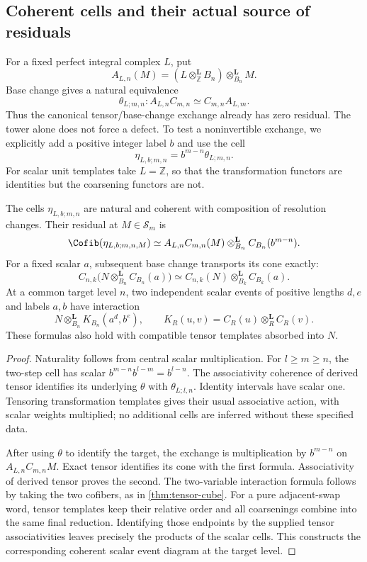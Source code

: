 \subsection{Coherent cells and their actual source of residuals}

For a fixed perfect integral complex $L$, put
\[
 A_{L,n}(M)=(L\otimes^{\mathbf L}_{\mathbb Z}B_n)\otimes^{\mathbf L}_{B_n}M.
\]
Base change gives a natural equivalence
\[
 \theta_{L;m,n}:A_{L,n}C_{m,n}\simeq C_{m,n}A_{L,m}.
\]
Thus the canonical tensor/base-change exchange already has zero residual. The tower alone does not force a defect. To test a noninvertible exchange, we explicitly add a positive integer label $b$ and use the cell
\[
 \eta_{L,b;m,n}=b^{m-n}\theta_{L;m,n}.
\]
For scalar unit templates take $L=\mathbb Z$, so that the transformation functors are identities but the coarsening functors are not.

\begin{theorem}\label{thm:weighted-adic-exchange}
The cells $\eta_{L,b;m,n}$ are natural and coherent with composition of resolution changes. Their residual at $M\in\mathcal S_m$ is
\[
 \Cofib(\eta_{L,b;m,n,M})\simeq
 A_{L,n}C_{m,n}(M)\otimes^{\mathbf L}_{B_n}C_{B_n}(b^{m-n}).
\]
For a fixed scalar $a$, subsequent base change transports its cone exactly:
\[
 C_{n,k}\bigl(N\otimes^{\mathbf L}_{B_n}C_{B_n}(a)\bigr)
 \simeq C_{n,k}(N)\otimes^{\mathbf L}_{B_k}C_{B_k}(a).
\]
At a common target level $n$, two independent scalar events of positive lengths $d,e$ and labels $a,b$ have interaction
\[
 N\otimes^{\mathbf L}_{B_n}K_{B_n}(a^d,b^e),\qquad
 K_R(u,v)=C_R(u)\otimes^{\mathbf L}_R C_R(v).
\]
These formulas also hold with compatible tensor templates absorbed into $N$.
\end{theorem}
\begin{proof}
Naturality follows from central scalar multiplication. For $l\geq m\geq n$, the two-step cell has scalar $b^{m-n}b^{l-m}=b^{l-n}$. The associativity coherence of derived tensor identifies its underlying $\theta$ with $\theta_{L;l,n}$. Identity intervals have scalar one. Tensoring transformation templates gives their usual associative action, with scalar weights multiplied; no additional cells are inferred without these specified data.

After using $\theta$ to identify the target, the exchange is multiplication by $b^{m-n}$ on $A_{L,n}C_{m,n}M$. Exact tensor identifies its cone with the first formula. Associativity of derived tensor proves the second. The two-variable interaction formula follows by taking the two cofibers, as in \cref{thm:tensor-cube}. For a pure adjacent-swap word, tensor templates keep their relative order and all coarsenings combine into the same final reduction. Identifying those endpoints by the supplied tensor associativities leaves precisely the products of the scalar cells. This constructs the corresponding coherent scalar event diagram at the target level.
\end{proof}

